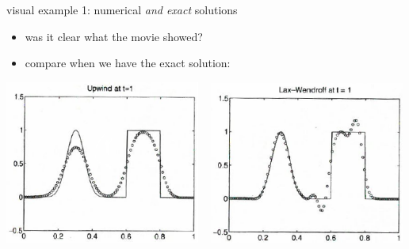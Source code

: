 \documentclass[10pt,hyperref,dvipsnames]{beamer}
\begin{document}
\begin{frame}{visual example 1: numerical \emph{and exact} solutions}

\begin{itemize}
\item was it clear what the movie showed?
\item compare when we have the exact solution:
\end{itemize}

\bigskip
\hfill \mbox{\includegraphics[width=0.48\textwidth]{figs/leveque6p1upwind} \, \includegraphics[width=0.48\textwidth]{figs/leveque6p1lw}}
\end{frame}
\end{document}
